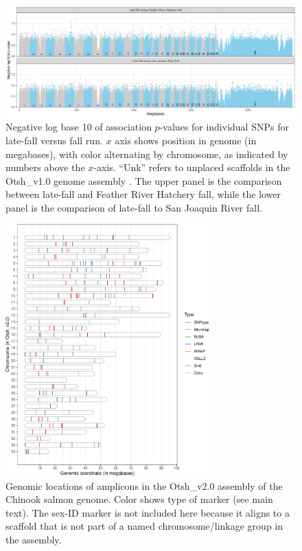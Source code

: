 
\begin{figure}
\includegraphics[width=\textwidth]{images/lfar-assoc-faceted.jpg}
\caption[
	Negative log base 10 of association $p$-values for
	individual SNPs for late-fall versus fall run
]{
	\footnotesize Negative log base 10 of association $p$-values for
	individual SNPs for late-fall versus fall run.  $x$ axis shows position in genome (in megabases),
	with color alternating by chromosome, as indicated by numbers above the $x$-axis. ``Unk'' refers
	to unplaced scaffolds in the Otsh\_v1.0 genome assembly \citep{christensen2018chinook}. The 
	upper panel is the comparison between late-fall and Feather River Hatchery fall, while the lower 
	panel is the comparison of late-fall to San Joaquin River fall. 
}
\label{fig:lfar-assoc}
\end{figure}



\begin{figure}
\begin{center}
\includegraphics[width=0.7\textwidth]{images/genomic-locations-plot.pdf}
\end{center}
\caption[Genomic locations of amplicons]{\footnotesize Genomic locations of amplicons in the
Otsh\_v2.0 assembly of the Chinook salmon genome.  Color shows type of marker (see main text).
The sex-ID marker is not included here because it aligns to a scaffold that is not part of a
named chromosome/linkage group in the assembly.}
\label{fig:genome-locations}
\end{figure}





